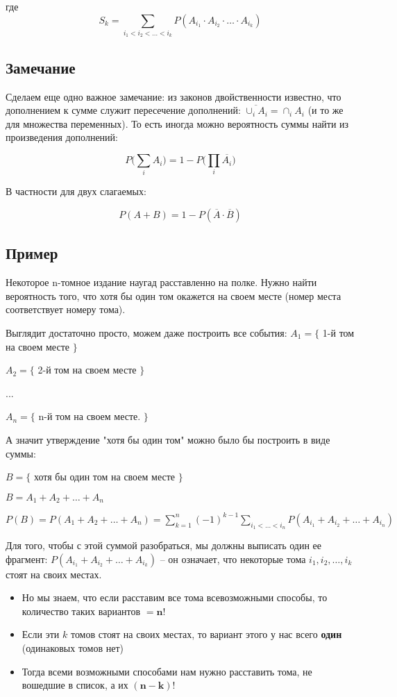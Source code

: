 \documentclass{article}
\begin{document}
где $$ S_k = \sum\limits_{i_1 < i_2 < \ldots < i_k} P(A_{i_1} \cdot A_{i_2} \cdot \ldots \cdot A_{i_k}) $$

\subsection {Замечание}
Сделаем еще одно важное замечание: из законов двойственности известно, что дополнением к сумме служит пересечение дополнений: $\overline{\cup_i A_i} = \cap_i A_i $ (и то же для множества переменных). То есть иногда можно вероятность суммы найти из произведения дополнений:

$$ P\Biggl(\sum\limits_i A_i\Biggr) = 1 - P\Biggl(\prod\limits_i \overline{A_i}\Biggr) $$

В частности для двух слагаемых:

$$P(A + B) = 1 - P(\overline{A} \cdot \overline{B}) $$

\subsection{Пример}

Некоторое n-томное издание наугад расставленно на полке. Нужно найти вероятность того, что хотя бы один том окажется на своем месте (номер места соответствует номеру тома).

\quad
Выглядит достаточно просто, можем даже построить все события:
$A_1 = \{$ 1-й том на своем месте $\}$

$A_2 = \{$ 2-й том на своем месте $\}$

...

$A_n = \{$ n-й том на своем месте. $\}$

\quad

А значит утверждение "хотя бы один том" можно было бы построить в виде суммы:

$B = \{$ хотя бы один том на своем месте $\}$

$B = A_1 + A_2 + \ldots + A_n$

$P(B) = P(A_1 + A_2 + \ldots + A_n) = \sum\limits_{k = 1}^n (-1)^{k - 1} \sum\limits_{i_1 < \ldots < i_n} P(A_{i_1} + A_{i_2} + \ldots + A_{i_n})$

\quad

Для того, чтобы с этой суммой разобраться, мы должны выписать один ее фрагмент: \newline$P(A_{i_1} + A_{i_2} + \ldots + A_{i_k})$ -- он означает, что некоторые тома $i_1, i_2, \ldots, i_k$  стоят на своих местах.

\begin{itemize}

\item Но мы знаем, что если расставим все тома всевозможными способы, то количество таких вариантов $\boldsymbol{= n!}$

\item Если эти $k$ томов стоят на своих местах, то вариант этого у нас всего \textbf{один} (одинаковых томов нет)

\item Тогда всеми возможными способами нам нужно расставить тома, не вошедшие в список, а их $\boldsymbol{(n - k)}!$
\end{itemize}
\end{document}
